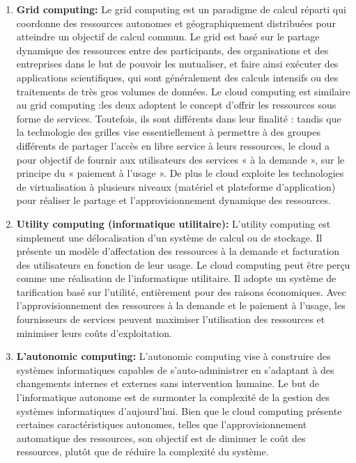 \begin{enumerate}
\item \textbf{Grid computing: }   Le grid computing  est un paradigme de calcul réparti qui coordonne des ressources autonomes et géographiquement distribuées pour atteindre un objectif de calcul commun. Le grid est basé sur le partage dynamique des ressources entre des participants, des organisations et des entreprises dans le but de pouvoir les mutualiser, et faire ainsi exécuter des applications scientifiques, qui sont généralement des calculs intensifs ou des traitements de très gros volumes de données. Le cloud computing  est similaire au grid computing :les deux adoptent le concept d’offrir les  ressources sous forme de services. Toutefois, ils sont différents dans leur finalité : tandis que la technologie des grilles vise essentiellement à permettre à des groupes différents de partager l’accès en libre service à leurs ressources, le cloud a pour objectif de fournir aux utilisateurs des services « à la demande », sur le principe du « paiement à l’usage ». De plus le cloud  exploite les technologies de virtualisation à plusieurs niveaux (matériel et plateforme d'application) pour réaliser le partage et l'approvisionnement dynamique des ressources.  
\item \textbf{Utility computing  (informatique utilitaire): } L’utility computing  est simplement une délocalisation d'un système de calcul ou de stockage. Il présente un modèle d’affectation des ressources à la demande et facturation des utilisateurs en fonction de leur usage. Le cloud computing  peut être perçu comme une réalisation de l'informatique utilitaire. Il adopte un système de tarification basé sur l'utilité, entièrement pour des raisons économiques. Avec l'approvisionnement des ressources à la demande et le paiement à l’usage, les fournisseurs de services peuvent maximiser l'utilisation des ressources et minimiser leurs coûts d'exploitation.

\item \textbf{L'autonomic computing: }  L’autonomic computing  vise à construire des systèmes  informatiques capables de s’auto-administrer en s’adaptant à des changements  internes et externes sans intervention humaine. Le but de l'informatique autonome est de surmonter la complexité de la gestion des systèmes informatiques d'aujourd'hui. Bien que le cloud computing  présente certaines caractéristiques autonomes, telles que l’approvisionnement automatique des ressources, son objectif est de diminuer le coût des ressources, plutôt que de réduire la complexité du système.


\end{enumerate}
